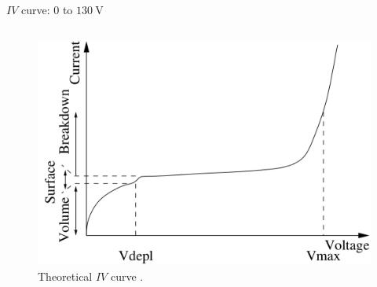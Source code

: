 


\frame{\maketitle}




\begin{frame}{ $IV$ curve: $0$ to $\SI{130}{\volt}$}

  \begin{columns}

   \begin{column}{0.48\textwidth}
     \begin{figure}
       \centering
       \includegraphics[width=1.05\textwidth]{./iv_curve_reverse_bias_pixel_detectors.png}
       \caption{ Theoretical $IV$ curve \cite{pixel_detectors}. }
       \label{ fig: iv_curve_theoretical}
     \end{figure}
   \end{column}


\end{columns}
\end{frame}
